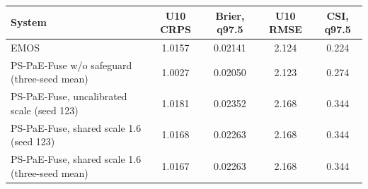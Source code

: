 \begin{tabular}{lcccc}
\hline
System & U10 CRPS & Brier, q97.5 & U10 RMSE & CSI, q97.5 \\
\hline
EMOS & 1.0157 & 0.02141 & 2.124 & 0.224 \\
PS-PaE-Fuse w/o safeguard (three-seed mean) & 1.0027 & 0.02050 & 2.123 & 0.274 \\
PS-PaE-Fuse, uncalibrated scale (seed 123) & 1.0181 & 0.02352 & 2.168 & 0.344 \\
PS-PaE-Fuse, shared scale 1.6 (seed 123) & 1.0168 & 0.02263 & 2.168 & 0.344 \\
PS-PaE-Fuse, shared scale 1.6 (three-seed mean) & 1.0167 & 0.02263 & 2.168 & 0.344 \\
\hline
\end{tabular}
